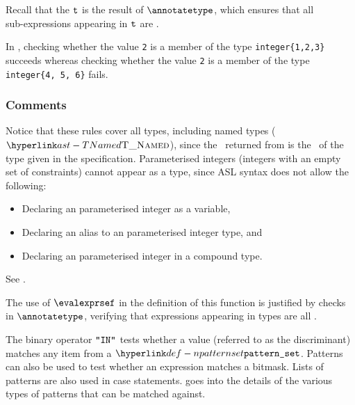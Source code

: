 Recall that the $\texttt{t}$ is the result of $\annotatetype$, which ensures that
all \\
sub-expressions appearing in $\texttt{t}$ are \sideeffectfreeterm{}.

In ,
checking whether the value \verb|2| is a member of the type \verb|integer{1,2,3}|
succeeds whereas checking whether the value \verb|2| is a member
of the type \verb|integer{4, 5, 6}| fails.


\subsubsection{Comments}
Notice that these rules cover all types, including named types ($\TNamed$),
since the \typedast\ returned from  is the \structureterm\ of the type
given in the specification.
%
Parameterised integers (integers with an empty set of constraints)
cannot appear as a type, since ASL syntax does not allow the following:
\begin{itemize}
\item Declaring an parameterised integer as a variable,
\item Declaring an alias to an parameterised integer type, and
\item Declaring an parameterised integer in a compound type.
\end{itemize}


See .

The use of $\evalexprsef$ in the definition of this function is justified by checks in $\annotatetype$, verifying
that expressions appearing in types are all \sideeffectfreeterm{}.


\hypertarget{def-patternexpressionterm}{}
The binary operator $\texttt{"}\texttt{IN}\texttt{"}$ tests whether a value (referred to as the discriminant) matches any item from a $\Npatternset$.
Patterns can also be used to test whether an expression matches a bitmask.
Lists of patterns are also used in case statements.
%
 goes into the details of the various types of patterns that can be matched against.

